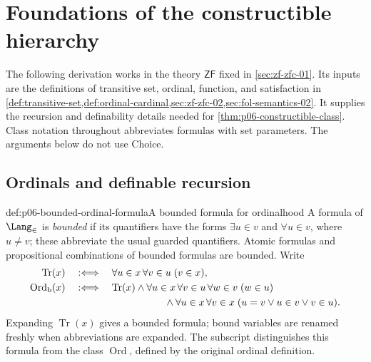 \section{Foundations of the constructible hierarchy}
\label{sec:p06-constructible-hierarchy-foundations}

The following derivation works in the theory \(\mathsf{ZF}\) fixed in
\cref{sec:zf-zfc-01}.  Its inputs are the definitions of transitive set,
ordinal, function, and satisfaction in
\cref{def:transitive-set,def:ordinal-cardinal,sec:zf-zfc-02,sec:fol-semantics-02}.
It supplies the recursion and definability details needed for
\cref{thm:p06-constructible-class}.  Class notation throughout abbreviates
formulas with set parameters.  The arguments below do not use Choice.

\subsection{Ordinals and definable recursion}

\begin{hbdefinition}{def:p06-bounded-ordinal-formula}{A bounded formula for ordinalhood}
A formula of \(\Lang_{\in}\) is \emph{bounded} if its quantifiers have
the forms \(\exists u\in v\) and \(\forall u\in v\), where \(u\ne v\);
these abbreviate the usual guarded quantifiers.  Atomic formulas and
propositional combinations of bounded formulas are bounded.  Write
\[
\begin{aligned}
 \operatorname{Tr}(x)&\quad:\Longleftrightarrow\quad
       \forall u\in x\,\forall v\in u\;(v\in x),\\
 \operatorname{Ord}_{\mathrm b}(x)&\quad:\Longleftrightarrow\quad
       \operatorname{Tr}(x)
       \land\forall u\in x\,\forall v\in u\,\forall w\in v\;(w\in u)\\
       &\hspace{35mm}\land
       \forall u\in x\,\forall v\in x\;
                (u=v\lor u\in v\lor v\in u).
\end{aligned}
\]
Expanding \(\operatorname{Tr}(x)\) gives a bounded formula; bound
variables are renamed freshly when abbreviations are expanded.
The subscript distinguishes this formula from the class
\(\operatorname{Ord}\), defined by the original ordinal definition.
\end{hbdefinition}

